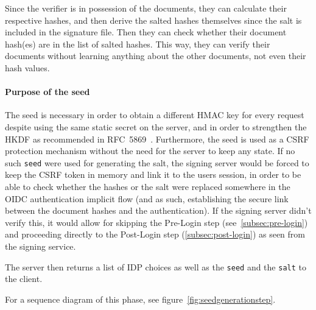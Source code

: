 Since the verifier is in possession of the documents, they can calculate their respective hashes,
and then derive the salted hashes themselves since the salt is included in the signature file.
Then they can check whether their document hash(es) are in the list of salted hashes.
This way, they can verify their documents without learning anything about the other documents,
not even their hash values.

\paragraph{Purpose of the seed}
The seed is necessary in order to obtain a different \gls{HMAC} key for every request
despite using the same static secret on the server,
and in order to strengthen the \gls{HKDF} as recommended in RFC~5869~\cite[Section 3.1]{rfc5869}.
Furthermore, the seed is used as a \gls{CSRF} protection mechanism without the need for the server to keep any state.
If no such \texttt{seed} were used for generating the salt,
the signing server would be forced to keep the \gls{CSRF} token in memory and link it to the users session,
in order to be able to check whether the hashes or the salt were replaced somewhere in the \gls{OIDC} authentication implicit flow
(and as such, establishing the secure link between the document hashes and the authentication).
If the signing server didn't verify this,
it would allow for skipping the Pre-Login step (see~\ref{subsec:pre-login})
and proceeding directly to the Post-Login step (\ref{subsec:post-login}) as seen from the signing service.

The server then returns a list of \gls{IDP} choices as well as the \texttt{seed} and the \texttt{salt} to the client.

For a sequence diagram of this phase, see figure~\ref{fig:seedgenerationstep}.


